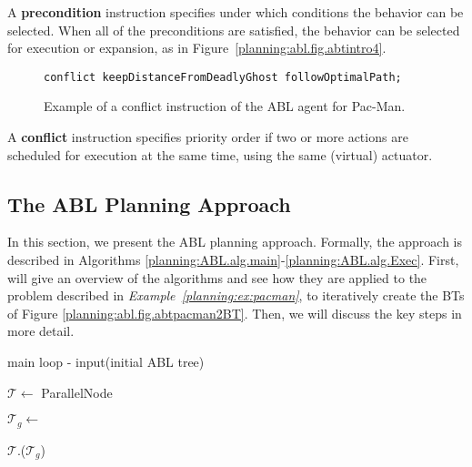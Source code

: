 A \textbf{precondition} instruction specifies
under which conditions the behavior can be selected. When all
of the preconditions are satisfied, the behavior
can be selected for execution or expansion, as in Figure~\ref{planning:abl.fig.abtintro4}. 



\begin{figure}[h]
\centering
\begin{lstlisting}
conflict keepDistanceFromDeadlyGhost followOptimalPath; 
\end{lstlisting}
\caption{Example of a conflict instruction of the ABL agent for Pac-Man.}
\label{planning:rt.fig.abtintro5}
\end{figure}

A \textbf{conflict} instruction specifies priority order if two or more actions are scheduled for execution at the same time, using the same (virtual) actuator. 

\subsection{The ABL Planning Approach}

In this section, we present the ABL planning approach.
Formally, the  approach is described in Algorithms \ref{planning:ABL.alg.main}-\ref{planning:ABL.alg.Exec}.
First, will give an overview of the algorithms and see how they are applied to the problem described in \emph{Example~\ref{planning:ex:pacman}},
to iteratively create the BTs of Figure \ref{planning:abl.fig.abtpacman2BT}.
Then, we will discuss the key steps in more detail.


\begin{algorithm2e}[h!]
\caption{main loop - input(initial ABL tree)}
 \label{planning:ABL.alg.main}
\DontPrintSemicolon
%
 $\mathcal{T} \gets$ ParallelNode \label{planning:ABL.alg.main.T} \\
 {
 $\mathcal{T}_g \gets$  \label{planning:ABL.alg.main.subgoal}
 
 $\mathcal{T}$.($\mathcal{T}_g$)\\

 }
 
 
\end{algorithm2e}






